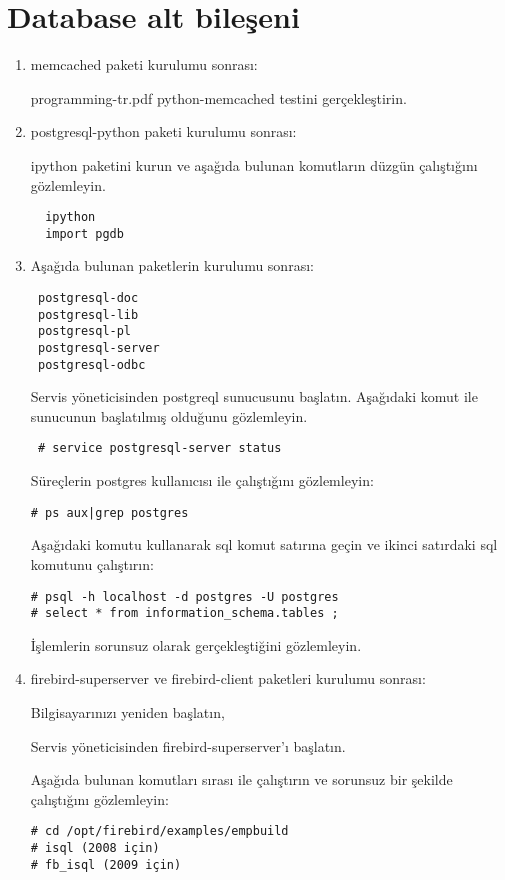 \documentclass[a4paper,10pt]{article}
\begin{document}
\section{Database alt bileşeni}
\begin{enumerate}
\item memcached paketi kurulumu sonrası:

programming-tr.pdf python-memcached testini gerçekleştirin.

\item postgresql-python paketi kurulumu sonrası:

ipython paketini kurun ve aşağıda bulunan komutların düzgün çalıştığını gözlemleyin.
 \begin{verbatim}
  ipython
  import pgdb \end{verbatim}


 \item Aşağıda bulunan paketlerin kurulumu sonrası:
\begin{verbatim}
 postgresql-doc
 postgresql-lib
 postgresql-pl
 postgresql-server
 postgresql-odbc
\end{verbatim}

Servis yöneticisinden postgreql sunucusunu başlatın. Aşağıdaki komut ile sunucunun başlatılmış olduğunu gözlemleyin.
\begin{verbatim}
 # service postgresql-server status
\end{verbatim}

Süreçlerin postgres kullanıcısı ile çalıştığını gözlemleyin:
\begin{verbatim}
# ps aux|grep postgres 
\end{verbatim}

Aşağıdaki komutu kullanarak sql komut satırına geçin ve ikinci satırdaki sql komutunu çalıştırın:
\begin{verbatim}
# psql -h localhost -d postgres -U postgres
# select * from information_schema.tables ;
\end{verbatim}

İşlemlerin sorunsuz olarak gerçekleştiğini gözlemleyin.

 \item firebird-superserver ve firebird-client paketleri kurulumu sonrası:

Bilgisayarınızı yeniden başlatın,

Servis yöneticisinden firebird-superserver'ı başlatın.

Aşağıda bulunan komutları sırası ile çalıştırın ve sorunsuz bir şekilde çalıştığını gözlemleyin:
\begin{verbatim}
# cd /opt/firebird/examples/empbuild
# isql (2008 için)
# fb_isql (2009 için)


\end{verbatim}
\end{enumerate}
\end{document}

